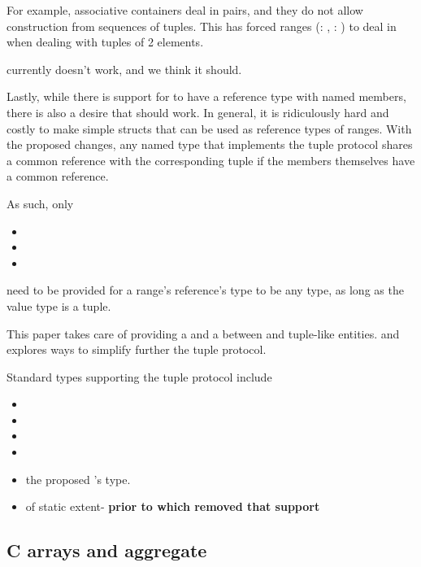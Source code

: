 \documentclass{wg21}
\begin{document}
For example, associative containers deal in pairs, and they do not allow construction from sequences of tuples. This has forced ranges (: , : ) to deal in  when dealing with tuples of 2 elements.

 currently doesn't work, and we think it should.

Lastly, while there is support for  to have a reference type with named members, there is also a desire
that  should work.
In general, it is ridiculously hard and costly to make simple structs that can be used as reference types of ranges.
With the proposed changes, any named type that implements the tuple protocol shares a common reference with the corresponding tuple if the members themselves have a common reference.

As such, only
\begin{itemize}
\item {}
\item {}
\item {}
\end{itemize}

need to be provided for a range's reference's type to be any type, as long as the value type is a tuple.

This paper takes care of providing a  and a 
between  and tuple-like entities.
 and  explores ways to simplify further the tuple protocol.

Standard types supporting the tuple protocol include

\begin{itemize}
\item {}
\item {}
\item {}
\item {}
\item the proposed 's  type.
\item {} of static extent- \textbf{prior to  which removed that support}
\end{itemize}

\subsection{C arrays and aggregate}
\end{document}
